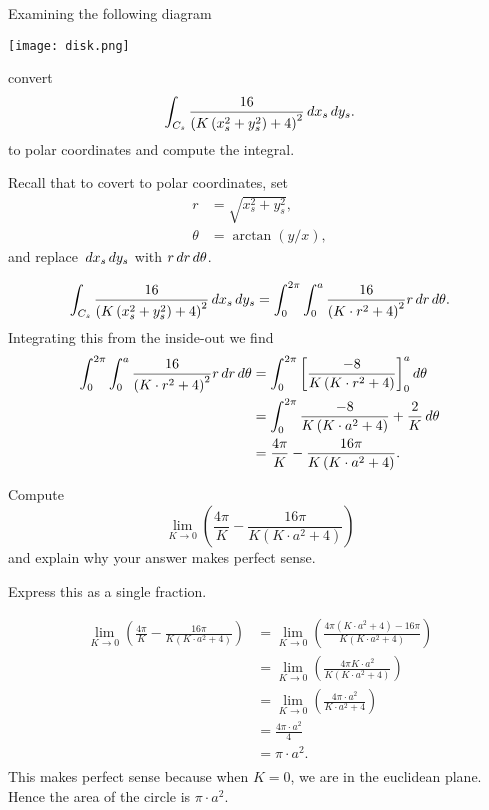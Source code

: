 \documentclass{ximera}
\begin{document}
\begin{problem}
  Examining the following diagram
  \begin{image}
    \texttt{[image: disk.png]}
  \end{image}
  convert
  \[
  \int_{C_s} \frac{16}{\left(K\left(x_s^2+y_s^2\right)+4\right)^2} \,d x_s\,d y_s.
  \]
  to polar coordinates and compute the integral.
  \begin{hint}
    Recall that to covert to polar coordinates, set
    \begin{align*}
      r &= \sqrt{x_s^2+y_s^2},\\
      \theta &= \arctan(y/x),
    \end{align*}
    and replace $\,d x_s\,d y_s$ with $r\,d r\,d \theta$.
  \end{hint}
  \begin{freeResponse}
    \[
    \int_{C_s} \frac{16}{\left(K\left(x_s^2+y_s^2\right)+4\right)^2} \,d x_s\,d y_s
    = \int_0^{2\pi} \int_0^a \frac{16}{\left(K\cdot r^2+4\right)^2} r\,d r \,d \theta.
    \]
    Integrating this from the inside-out we find
    \begin{align*}
      \int_0^{2\pi} \int_0^a \frac{16}{\left(K\cdot r^2+4\right)^2} r\,d r \,d \theta
      &= \int_0^{2\pi} \bigg[ \frac{-8}{K\left(K\cdot r^2+4\right)} \bigg]_0^a \,d \theta\\
      &= \int_0^{2\pi} \frac{-8}{K\left(K\cdot a^2+4\right)}+\frac{2}{K} \,d \theta\\
      &= \frac{4\pi}{K}-\frac{16\pi}{K\left(K\cdot a^2+4\right)}.   
    \end{align*}
  \end{freeResponse}
\end{problem}


\begin{problem}
  Compute
  \[
  \lim_{K\to 0} \left(\frac{4\pi}{K}-\frac{16\pi}{K\left(K\cdot a^2+4\right)}\right)
  \]
  and explain why your answer makes perfect sense.
  \begin{hint}
    Express this as a single fraction.
  \end{hint}
  \begin{freeResponse}
    \begin{align*}
    \lim_{K\to 0} \left(\frac{4\pi}{K}-\frac{16\pi}{K\left(K\cdot a^2+4\right)}\right)
    &= \lim_{K\to 0} \left(\frac{4\pi\left(K\cdot a^2+4\right) - 16\pi}{K\left(K\cdot a^2+4\right)}\right)\\
    &= \lim_{K\to 0} \left(\frac{4\pi K\cdot a^2}{K\left(K\cdot a^2+4\right)}\right)\\
    &= \lim_{K\to 0} \left(\frac{4\pi\cdot a^2}{K\cdot a^2+4}\right)\\
    &= \frac{4\pi\cdot a^2}{4}\\
    &= \pi\cdot a^2.\\
    \end{align*}
    This makes perfect sense because when $K=0$, we are in the
    euclidean plane. Hence the area of the circle is $\pi\cdot a^2$.
  \end{freeResponse}
\end{problem}
\end{document}
